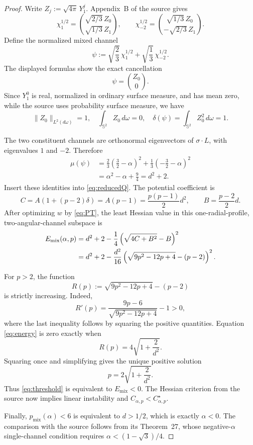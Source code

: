 \documentclass[11pt]{article}
\newcommand{\Sph}{\mathbb S^2}
\begin{document}
\begin{proof}
Write $Z_j:=\sqrt{4\pi}\,Y_1^j$.  Appendix~B of the source gives
\[
 \chi_1^{1/2}
 =\binom{\sqrt{2/3}\,Z_0}{\sqrt{1/3}\,Z_1},
 \qquad
 \chi_{-2}^{1/2}
 =\binom{\sqrt{1/3}\,Z_0}{-\sqrt{2/3}\,Z_1}.
\]
Define the normalized mixed channel
\begin{equation}\label{eq:psi}
 \psi:=\sqrt{\frac23}\,\chi_1^{1/2}
       +\sqrt{\frac13}\,\chi_{-2}^{1/2}.
\end{equation}
The displayed formulas show the exact cancellation
\[
 \psi=\binom{Z_0}{0}.
\]
Since $Y_1^0$ is real, normalized in ordinary surface measure, and has mean
zero, while the source uses probability surface measure, we have
\[
 \|Z_0\|_{L^2(d\omega)}=1,
 \quad \int_{\Sph}Z_0\,d\omega=0,
 \quad \delta(\psi)=\int_{\Sph}Z_0^2\,d\omega=1.
\]

The two constituent channels are orthonormal eigenvectors of
$\sigma\!\cdot\!L$, with eigenvalues $1$ and $-2$.  Therefore
\begin{align*}
 \mu(\psi)
 &=\frac23\left(\frac32-\alpha\right)^2
   +\frac13\left(-\frac32-\alpha\right)^2 \\
 &=\alpha^2-\alpha+\frac94
  =d^2+2.
\end{align*}
Insert these identities into \eqref{eq:reducedQ}.  The potential coefficient is
\[
 C=A(1+(p-2)\delta)=A(p-1)=\frac{p(p-1)}2d^2,
 \qquad B=\frac{p-2}{2}d.
\]
After optimizing $w$ by \eqref{eq:PT}, the least Hessian value in this
one-radial-profile, two-angular-channel subspace is
\begin{align}
 E_{\mathrm{mix}}(\alpha,p)
 &=d^2+2-\frac14\left(\sqrt{4C+B^2}-B\right)^2 \notag\\
 &=d^2+2-\frac{d^2}{16}
 \left(\sqrt{9p^2-12p+4}-(p-2)\right)^2.\label{eq:energy}
\end{align}

For $p>2$, the function
\[
 R(p):=\sqrt{9p^2-12p+4}-(p-2)
\]
is strictly increasing.  Indeed,
\[
 R'(p)=\frac{9p-6}{\sqrt{9p^2-12p+4}}-1>0,
\]
where the last inequality follows by squaring the positive quantities.
Equation \eqref{eq:energy} is zero exactly when
\[
 R(p)=4\sqrt{1+\frac2{d^2}}.
\]
Squaring once and simplifying gives the unique positive solution
\[
 p=2\sqrt{1+\frac2{d^2}}.
\]
Thus \eqref{eq:threshold} is equivalent to $E_{\mathrm{mix}}<0$.
The Hessian criterion from the source now implies linear instability and
$C_{\alpha,p}<C^\star_{\alpha,p}$.

Finally, $p_{\mathrm{mix}}(\alpha)<6$ is equivalent to $d>1/2$, which is
exactly $\alpha<0$.  The comparison with the source follows from its
Theorem~27, whose negative-$\alpha$ single-channel condition requires
$\alpha<(1-\sqrt3)/4$.
\end{proof}
\end{document}
